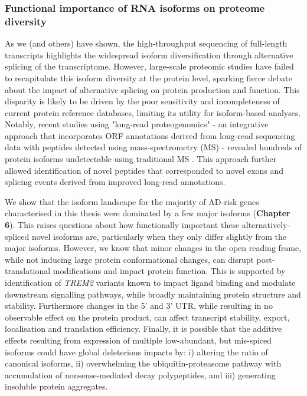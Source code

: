 \subsubsection{Functional importance of RNA isoforms on proteome diversity} 
As we (and others) have shown, the high-throughput sequencing of full-length transcripts highlights the widespread isoform diversification through alternative splicing of the transcriptome. However, large-scale proteomic studies have failed to recapitulate this isoform diversity at the protein level, sparking fierce debate about the impact of alternative splicing on protein production and function\cite{Tress2017a,Blencowe2017,Tress2017b}. This disparity is likely to be driven by the poor sensitivity and incompleteness of current protein reference databases, limiting its utility for isoform-based analyses\cite{Reixachs-Sole2022}. Notably, recent studies using "long-read proteogenomics" - an integrative approach that incorporates ORF annotations derived from long-read sequencing data with peptides detected using mass-spectrometry (MS) - revealed hundreds of protein isoforms undetectable using traditional MS \cite{Miller2022,Wang2019a}. This approach further allowed identification of novel peptides that corresponded to novel exons and splicing events derived from improved long-read annotations\cite{Miller2022}.  

We show that the isoform landscape for the majority of AD-risk genes characterised in this thesis were dominated by a few major isoforms (\textbf{Chapter 6}). This raises questions about how functionally important these alternatively-spliced novel isoforms are, particularly when they only differ slightly from the major isoforms. However, we know that minor changes in the open reading frame, while not inducing large protein conformational changes, can disrupt post-translational modifications and impact protein function\cite{Reixachs-Sole2022}. This is supported by identification of \textit{TREM2} variants known to impact ligand binding and modulate downstream signalling pathways, while broadly maintaining protein structure and stability\cite{Kober2016}. Furthermore changes in the 5' and 3' UTR, while resulting in no observable effect on the protein product, can affect transcript stability, export, localisation and translation efficiency\cite{Reixachs-Sole2022}. Finally, it is possible that the additive effects resulting from expression of multiple low-abundant, but mis-spiced isoforms could have global deleterious impacts by: i) altering the ratio of canonical isoforms, ii) overwhelming the ubiquitin-proteasome pathway with accumulation of nonsense-mediated decay polypeptides, and iii) generating insoluble protein aggregates. 

